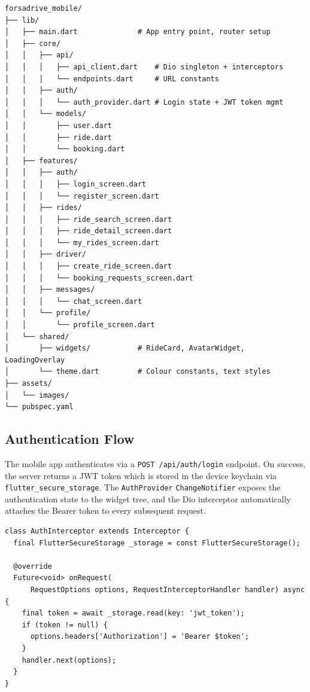 \documentclass[12pt,a4paper,openright]{report}
\begin{document}
\begin{lstlisting}[basicstyle=\ttfamily\small, numbers=none, frame=none, caption={Flutter Project Structure}]
forsadrive_mobile/
├── lib/
│   ├── main.dart              # App entry point, router setup
│   ├── core/
│   │   ├── api/
│   │   │   ├── api_client.dart    # Dio singleton + interceptors
│   │   │   └── endpoints.dart     # URL constants
│   │   ├── auth/
│   │   │   └── auth_provider.dart # Login state + JWT token mgmt
│   │   └── models/
│   │       ├── user.dart
│   │       ├── ride.dart
│   │       └── booking.dart
│   ├── features/
│   │   ├── auth/
│   │   │   ├── login_screen.dart
│   │   │   └── register_screen.dart
│   │   ├── rides/
│   │   │   ├── ride_search_screen.dart
│   │   │   ├── ride_detail_screen.dart
│   │   │   └── my_rides_screen.dart
│   │   ├── driver/
│   │   │   ├── create_ride_screen.dart
│   │   │   └── booking_requests_screen.dart
│   │   ├── messages/
│   │   │   └── chat_screen.dart
│   │   └── profile/
│   │       └── profile_screen.dart
│   └── shared/
│       ├── widgets/           # RideCard, AvatarWidget, LoadingOverlay
│       └── theme.dart         # Colour constants, text styles
├── assets/
│   └── images/
└── pubspec.yaml
\end{lstlisting}

\subsection{Authentication Flow}

The mobile app authenticates via a \texttt{POST /api/auth/login} endpoint. On success, the server returns a JWT token which is stored in the device keychain via \texttt{flutter\_secure\_storage}. The \texttt{AuthProvider} \texttt{ChangeNotifier} exposes the authentication state to the widget tree, and the Dio interceptor automatically attaches the Bearer token to every subsequent request.

\begin{lstlisting}[style=dartstyle, caption={Dio Interceptor for JWT Auth Token Injection}]
class AuthInterceptor extends Interceptor {
  final FlutterSecureStorage _storage = const FlutterSecureStorage();

  @override
  Future<void> onRequest(
      RequestOptions options, RequestInterceptorHandler handler) async {
    final token = await _storage.read(key: 'jwt_token');
    if (token != null) {
      options.headers['Authorization'] = 'Bearer $token';
    }
    handler.next(options);
  }
}
\end{lstlisting}
\end{document}
